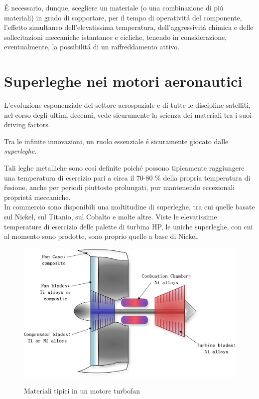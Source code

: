 \documentclass{article}
\begin{document}
    É necessario, dunque, scegliere un materiale (o una combinazione di piú materiali)
    in grado di sopportare, per il tempo di operativitá del componente, l'effetto
    simultaneo dell'elevatissima temperatura, dell'aggressivitá chimica e delle sollecitazioni meccaniche istantanee e cicliche,
    tenendo in considerazione, eventualmente, la possibilitá di un raffreddamento attivo.\\

    \clearpage




    \section{Superleghe nei motori aeronautici\label{superleghe_mot_aer}}
  
    L'evoluzione esponenziale del settore aerospaziale e di tutte le discipline satelliti, 
    nel corso degli ultimi decenni, vede sicuramente la scienza dei materiali 
    tra i suoi driving factors.

    Tra le infinite innovazioni, un ruolo essenziale é sicuramente giocato dalle \textit{superleghe}.

    Tali leghe metalliche sono cosí definite poiché possono tipicamente raggiungere
    una temperatura di esercizio pari a circa il 70-80 \% della propria temperatura di 
    fusione, anche per periodi piuttosto prolungati, pur mantenendo eccezionali
    proprietá meccaniche.
    \\ 

    In commercio sono disponibili una moltitudine di superleghe, tra cui quelle basate 
    sul Nickel, sul Titanio, sul Cobalto e molte altre.
    Viste le elevatissime temperature di esercizio delle palette di turbina HP, le
    uniche superleghe, con cui al momento sono prodotte, sono proprio quelle a base di Nickel. 
    
    \begin{figure}[h!]
        \centering
         \label{turbofan_drawing}
        \includegraphics[width=0.95 \textwidth]{Sources/engine_drawing.eps}
        \caption{Materiali tipici in un motore turbofan \autocite{Inkscape}}
    \end{figure}
\end{document}
